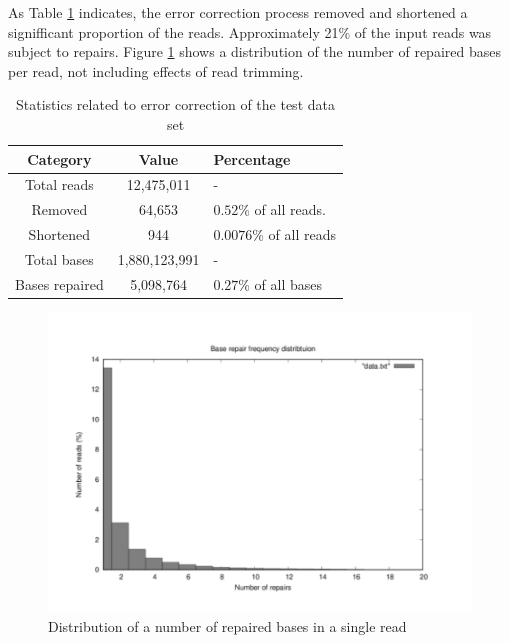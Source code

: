 As Table \ref{tab:test-correction} indicates, the error correction process removed and shortened a signifficant proportion of the reads. Approximately 21\% of the input reads was subject to repairs. Figure \ref{fig:test-repair-frequency} shows a distribution of the number of repaired bases per read, not including effects of read trimming.

\begin{table}[h]
\begin{center}
\caption{Statistics related to error correction of the test data set}
\label{tab:test-correction}
\begin{tabular}{| c | c | p{5cm} |}
\hline
Category & Value & Percentage \\
\hline
Total reads & 12,475,011 & - \\
\hline
Removed & 64,653 &  $0.52$\% of all reads. \\
\hline
Shortened & 944 & $0.0076$\% of all reads \\
\hline
Total bases & 1,880,123,991 & - \\
\hline
Bases repaired & 5,098,764 &  $0.27$\% of all bases \\
\hline
\end{tabular}
\end{center}
\end{table}

\begin{figure}[h]
	\centering
	\includegraphics{img/test-repair-frequency.pdf}
	\caption{Distribution of a number of repaired bases in a single read}
	\label{fig:test-repair-frequency}
\end{figure}

